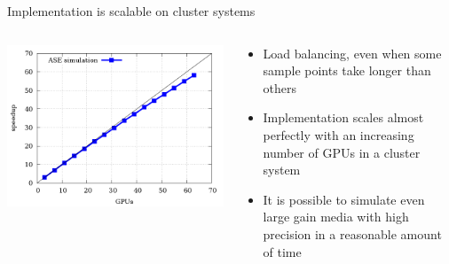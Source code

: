 \autobookmark
\begin{frame}{Implementation is scalable on cluster systems}
  \begin{columns}

    \begin{column}{.5\textwidth}
        \includegraphics[width=.5\paperwidth]{graphics/scaling.png}
      \end{column}

      \begin{column}{.5\textwidth}
        \begin{itemize}
          \item Load balancing, even when some sample points take longer than others
          \item Implementation scales almost perfectly with an increasing
            number of GPUs in a cluster system
          \item It is possible to simulate even large gain media with high
            precision in a reasonable amount of time
        \end{itemize}
      \end{column}

    \end{columns}
\end{frame}

